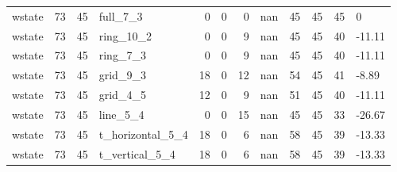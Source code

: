 \begin{longtable}{lrrlrrrlrrrl}
wstate & 73 & 45 & full\_7\_3 & 0 & 0 & 0 & nan & 45 & 45 & 45 & 0 \\
wstate & 73 & 45 & ring\_10\_2 & 0 & 0 & 9 & nan & 45 & 45 & 40 & -11.11 \\
wstate & 73 & 45 & ring\_7\_3 & 0 & 0 & 9 & nan & 45 & 45 & 40 & -11.11 \\
wstate & 73 & 45 & grid\_9\_3 & 18 & 0 & 12 & nan & 54 & 45 & 41 & -8.89 \\
wstate & 73 & 45 & grid\_4\_5 & 12 & 0 & 9 & nan & 51 & 45 & 40 & -11.11 \\
wstate & 73 & 45 & line\_5\_4 & 0 & 0 & 15 & nan & 45 & 45 & 33 & -26.67 \\
wstate & 73 & 45 & t\_horizontal\_5\_4 & 18 & 0 & 6 & nan & 58 & 45 & 39 & -13.33 \\
wstate & 73 & 45 & t\_vertical\_5\_4 & 18 & 0 & 6 & nan & 58 & 45 & 39 & -13.33 \\
\end{longtable}
